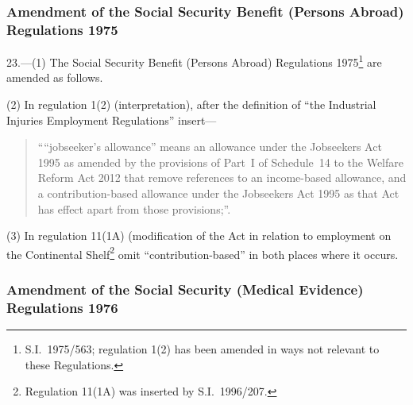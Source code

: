 \documentclass[12pt,a4paper]{article}
\begin{document}
\subsubsection[23. Amendment of the Social Security Benefit (Persons Abroad) Regulations 1975]{Amendment of the Social Security Benefit (Persons Abroad) Regulations 1975}

23.—(1) The Social Security Benefit (Persons Abroad) Regulations 1975\footnote{S.I.~1975/563; regulation 1(2) has been amended in ways not relevant to these Regulations.} are amended as follows.

(2) In regulation 1(2) (interpretation), after the definition of “the Industrial Injuries Employment Regulations” insert—
\begin{quotation}
““jobseeker’s allowance” means an allowance under the Jobseekers Act 1995 as amended by the provisions of Part~I of Schedule~14 to the Welfare Reform Act 2012 that remove references to an income-based allowance, and a contribution-based allowance under the Jobseekers Act 1995 as that Act has effect apart from those provisions;”.
\end{quotation}

(3) In regulation 11(1A) (modification of the Act in relation to employment on the Continental Shelf\footnote{Regulation 11(1A) was inserted by S.I.~1996/207.} omit “contribution-based” in both places where it occurs.

\subsubsection[24. Amendment of the Social Security (Medical Evidence) Regulations 1976]{Amendment of the Social Security (Medical Evidence) Regulations 1976}
\end{document}
